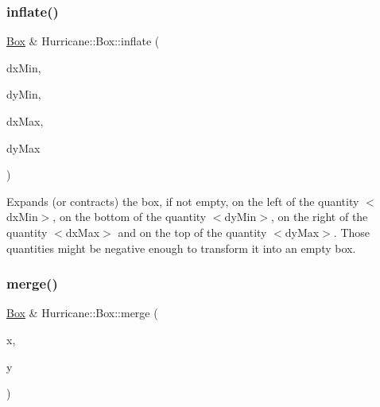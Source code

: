 \subsubsection{\texorpdfstring{inflate()}{inflate()}\hspace{0.1cm}{\footnotesize\ttfamily [3/3]}}
{\footnotesize\ttfamily \mbox{\hyperlink{classHurricane_1_1Box}{Box}} \& Hurricane\+::\+Box\+::inflate (\begin{DoxyParamCaption}\item[{const \mbox{\hyperlink{group__DbUGroup_ga4fbfa3e8c89347af76c9628ea06c4146}{Db\+U\+::\+Unit}} \&}]{dx\+Min,  }\item[{const \mbox{\hyperlink{group__DbUGroup_ga4fbfa3e8c89347af76c9628ea06c4146}{Db\+U\+::\+Unit}} \&}]{dy\+Min,  }\item[{const \mbox{\hyperlink{group__DbUGroup_ga4fbfa3e8c89347af76c9628ea06c4146}{Db\+U\+::\+Unit}} \&}]{dx\+Max,  }\item[{const \mbox{\hyperlink{group__DbUGroup_ga4fbfa3e8c89347af76c9628ea06c4146}{Db\+U\+::\+Unit}} \&}]{dy\+Max }\end{DoxyParamCaption})}

Expands (or contracts) the box, if not empty, on the left of the quantity {\ttfamily $<$dx\+Min$>$}, on the bottom of the quantity {\ttfamily $<$dy\+Min$>$}, on the right of the quantity {\ttfamily $<$dx\+Max$>$} and on the top of the quantity {\ttfamily $<$dy\+Max$>$}. Those quantities might be negative enough to transform it into an empty box. \mbox{\label{classHurricane_1_1Box_ab77fe56f9350f06cc872bbb4f83835da}} 
\subsubsection{\texorpdfstring{merge()}{merge()}\hspace{0.1cm}{\footnotesize\ttfamily [1/4]}}
{\footnotesize\ttfamily \mbox{\hyperlink{classHurricane_1_1Box}{Box}} \& Hurricane\+::\+Box\+::merge (\begin{DoxyParamCaption}\item[{const \mbox{\hyperlink{group__DbUGroup_ga4fbfa3e8c89347af76c9628ea06c4146}{Db\+U\+::\+Unit}} \&}]{x,  }\item[{const \mbox{\hyperlink{group__DbUGroup_ga4fbfa3e8c89347af76c9628ea06c4146}{Db\+U\+::\+Unit}} \&}]{y }\end{DoxyParamCaption})}

